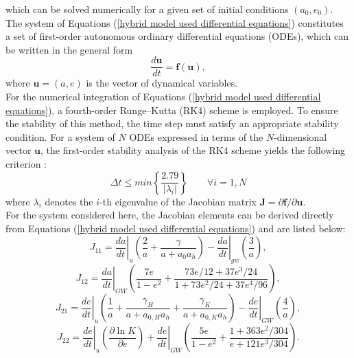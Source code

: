 \documentclass[12pt,twoside,openany]{book}
\begin{document}
which can be solved numerically for a given set of initial conditions $(a_0,e_0)$.\\The system of Equations (\ref{hybrid model used differential equations}) constitutes a set of first-order autonomous ordinary differential equations (ODEs), which can be written in the general form
\begin{equation}\label{ODEs}
    \frac{d\mathbf{u}}{dt}=\mathbf{f}(\mathbf{u}),
\end{equation}
where $\mathbf{u}=(a,e)$ is the vector of dynamical variables.\\For the numerical integration of Equations (\ref{hybrid model used differential equations}), a fourth-order Runge--Kutta (RK4) scheme is employed. To ensure the stability of this method, the time step must satisfy an appropriate stability condition. For a system of $N$ ODEs expressed in terms of the $N$-dimensional vector $\mathbf{u}$, the first-order stability analysis of the RK4 scheme yields the following criterion \parencite{Butcher_book}:
\begin{equation}
\label{RK4 stability criterion}
    \Delta t \le  min\left \{\frac{2.79}{|\lambda_i|}\right\} \qquad \forall i=1,N
\end{equation}
where $\lambda_i$ denotes the $i$-th eigenvalue of the Jacobian matrix $\mathbf{J}=\partial\mathbf{f}/\partial\mathbf{u}$.\\For the system considered here, the Jacobian elements can be derived directly from Equations (\ref{hybrid model used differential equations}) and are listed below:
\begin{equation}\label{J_11 of Sesana comparison}
    J_{11}=\left. \frac{da}{dt}\right|_u\left(\frac{2}{a}+\frac{\gamma}{a+a_0a_h}\right)-\left.\frac{da}{dt}\right|_{gw}\left(\frac{3}{a}\right),
\end{equation}
\begin{equation}\label{J_12 of Sesana comparison}
    J_{12}=\left. \frac{da}{dt}\right|_{GW}\left(\frac{{7e}}{1-e^2}+\frac{73e/12+37e^3/24}{1+73e^2/24+37e^4/96}\right),
\end{equation}
\begin{equation}\label{J_21 of Sesana comparison}
    J_{21}=\left.\frac{de}{dt}\right|_u\left(\frac{1}{a}+\frac{\gamma_H}{a+a_{0,H}a_h}+\frac{\gamma_K}{a+a_{0,K}a_h}\right)-\left.\frac{de}{dt}\right|_{GW}\left(\frac{4}{a}\right),
\end{equation}
\begin{equation}\label{J_22 of Sesana comparison}
    J_{22}=\left.\frac{de}{dt}\right|_u\left(\frac{\partial \ln{K}}{\partial e}\right)+\left.\frac{de}{dt}\right|_{GW}\left(\frac{5e}{1-e^2}+\frac{1+363e^2/304}{e+121e^3/304}\right).
\end{equation}
\end{document}
